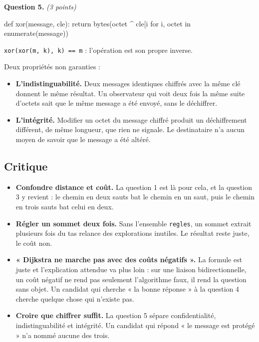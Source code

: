 \medskip
\textbf{Question 5.} \emph{(3 points)}

\begin{python}
def xor(message, cle):
    return bytes(octet ^ cle[i %
                 for i, octet in enumerate(message))
\end{python}

\lstinline{xor(xor(m, k), k) == m} : l'opération est son propre inverse.

Deux propriétés non garanties :

\begin{itemize}
  \item \textbf{L'indistinguabilité.} Deux messages identiques chiffrés avec la
    même clé donnent le même résultat. Un observateur qui voit deux fois la même
    suite d'octets sait que le même message a été envoyé, sans le déchiffrer.
  \item \textbf{L'intégrité.} Modifier un octet du message chiffré produit un
    déchiffrement différent, de même longueur, que rien ne signale. Le
    destinataire n'a aucun moyen de savoir que le message a été altéré.
\end{itemize}

\subsection*{Critique}

\begin{itemize}
  \item \textbf{Confondre distance et coût.} La question 1 est là pour cela, et
    la question 3 y revient : le chemin en deux sauts bat le chemin en un saut,
    puis le chemin en trois sauts bat celui en deux.
  \item \textbf{Régler un sommet deux fois.} Sans l'ensemble
    \lstinline{regles}, un sommet extrait plusieurs fois du tas relance des
    explorations inutiles. Le résultat reste juste, le coût non.
  \item \textbf{« Dijkstra ne marche pas avec des coûts négatifs ».} La formule
    est juste et l'explication attendue va plus loin : sur une liaison
    bidirectionnelle, un coût négatif ne rend pas seulement l'algorithme faux,
    il rend la question sans objet. Un candidat qui cherche « la bonne réponse »
    à la question 4 cherche quelque chose qui n'existe pas.
  \item \textbf{Croire que chiffrer suffit.} La question 5 sépare
    confidentialité, indistinguabilité et intégrité. Un candidat qui répond
    « le message est protégé » n'a nommé aucune des trois.
\end{itemize}

